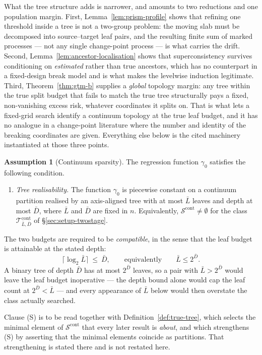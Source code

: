 \documentclass[11pt]{article}
\theoremstyle{plain}
\theoremstyle{definition}
\newtheorem{assumption}{Assumption}
\theoremstyle{remark}
\newcommand{\cT}{\mathcal{T}}
\newcommand{\cS}{\mathcal{S}}
\newcommand{\cTcont}{\cT^{\mathrm{cont}}_{\bar L,\bar D}}
\begin{document}
What the tree structure adds is narrower, and amounts to two reductions and
one population margin. First, Lemma~\ref{lem:prism-profile} shows that
refining one threshold inside a tree is not a two-group problem: the moving
slab must be decomposed into source--target leaf pairs, and the resulting
finite sum of marked processes --- not any single change-point process ---
is what carries the drift. Second, Lemma~\ref{lem:ancestor-localisation}
shows that superconsistency survives conditioning on \emph{estimated}
rather than true ancestors, which has no counterpart in a fixed-design
break model and is what makes the levelwise induction legitimate. Third,
Theorem~\ref{thm:gtm-b} supplies a \emph{global} topology margin: any tree
within the true split budget that fails to match the true tree structurally
pays a fixed, non-vanishing excess risk, whatever coordinates it splits on.
That is what lets a fixed-grid search identify a continuum topology at the
true leaf budget, and it has no analogue in a change-point literature where
the number and identity of the breaking coordinates are given. Everything
else below is the cited machinery instantiated at those three points.

\begin{assumption}[Continuum sparsity]\label{ass:continuum-sparsity}
The regression function \(\gamma_0\) satisfies the following condition.
\begin{enumerate}[leftmargin=*]
  \item[(S)] \emph{Tree realisability.}
  The function \(\gamma_0\) is piecewise constant on a continuum
  partition realised by an axis-aligned tree with at most \(\bar L\) leaves
  and depth at most \(\bar D\), where \(\bar L\) and \(\bar D\) are fixed in
  \(n\). Equivalently, \(\cS^{\mathrm{cont}}\ne\emptyset\) for the class
  \(\cTcont\) of \S\ref{sec:setup-twostage}.
\end{enumerate}
The two budgets are required to be \emph{compatible}, in the sense that the
leaf budget is attainable at the stated depth:
\[
  \lceil\log_2\bar L\rceil\ \le\ \bar D,
  \qquad\text{equivalently}\qquad
  \bar L\le2^{\bar D}.
\]
A binary tree of depth \(\bar D\) has at most \(2^{\bar D}\) leaves, so a pair
with \(\bar L>2^{\bar D}\) would leave the leaf budget inoperative --- the
depth bound alone would cap the leaf count at \(2^{\bar D}<\bar L\) --- and
every appearance of \(\bar L\) below would then overstate the class actually
searched.

Clause (S) is to be read together with Definition~\ref{def:true-tree}, which
selects the minimal element of \(\cS^{\mathrm{cont}}\) that every later result
is \emph{about}, and which strengthens (S) by asserting that the minimal
elements coincide as partitions. That strengthening is stated there and is not
restated here.
\end{assumption}
\end{document}
